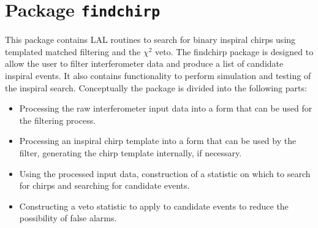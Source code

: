 \newcommand{\ospsd}{\ensuremath{S\left(\left|f_{k}\right|\right)}}

\chapter{Package \texttt{findchirp}}

This package contains LAL routines to search for binary inspiral chirps using
templated matched filtering and the $\chi^2$ veto. The findchirp package is
designed to allow the user to filter interferometer data and produce a list of
candidate inspiral events. It also contains functionality to perform
simulation and testing of the inspiral search. Conceptually the package is
divided into the following parts:

\begin{itemize}
\item Processing the raw interferometer input data into a form that can be
used for the filtering process.

\item Processing an inspiral chirp template into a form that can be used by
the filter, generating the chirp template internally, if necessary.

\item Using the processed input data, construction of a statistic on which to
search for chirps and searching for candidate events.

\item Constructing a veto statistic to apply to candidate events to reduce the
possibility of false alarms.

\end{itemize}

